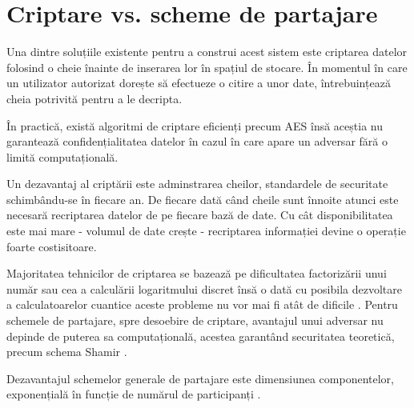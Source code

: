 \documentclass[oneside, 12pt]{book}
\begin{document}

\section{Criptare vs. scheme de partajare}

Una dintre soluțiile existente pentru a construi acest sistem este criptarea datelor folosind o cheie înainte de inserarea lor în spațiul de stocare. În momentul în care un utilizator autorizat dorește să efectueze o citire a unor date, întrebuințează cheia potrivită pentru a le decripta.

În practică, există algoritmi de criptare eficienți precum AES însă aceștia nu garantează confidențialitatea datelor în cazul în care apare un adversar fără o limită computațională.

Un dezavantaj al criptării este adminstrarea cheilor, standardele de securitate schimbându-se în fiecare an.
De fiecare dată când cheile sunt înnoite atunci este necesară recriptarea datelor de pe fiecare bază de date. Cu cât disponibilitatea este mai mare - volumul de date crește - recriptarea informației devine o operație foarte costisitoare. 

Majoritatea tehnicilor de criptarea se bazează pe dificultatea factorizării unui număr sau cea a calculării logaritmului discret însă o dată cu posibila dezvoltare a calculatoarelor cuantice aceste probleme nu vor mai fi atât de dificile \cite{Shor:1994}.
Pentru schemele de partajare, spre desoebire de criptare, avantajul unui adversar nu depinde de puterea sa computațională, acestea garantând securitatea teoretică, precum schema Shamir \cite{S:1979}.

Dezavantajul schemelor generale de partajare este dimensiunea componentelor, exponențială în funcție de numărul de participanți \cite{Survey:2011}.

\end{document}
